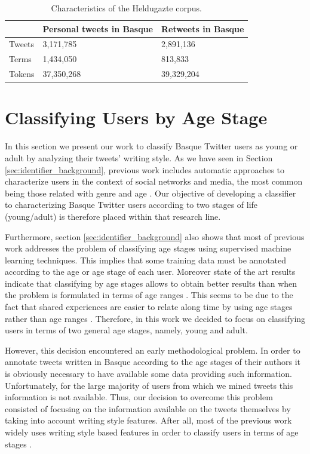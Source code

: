\documentclass[information,article,submit,moreauthors,pdftex,10pt,a4paper]{Definitions/mdpi}
\begin{document}
\begin{table}[H]
  \centering
  \begin{tabular}{lll} \hline
     & Personal tweets in Basque & Retweets in Basque \\ \hline \hline
    Tweets & 3,171,785 & 2,891,136 \\
    Terms & 1,434,050 & 813,833 \\
    Tokens & 37,350,268 & 39,329,204 \\ \hline
  \end{tabular}
  \caption{Characteristics of the Heldugazte corpus.}
  \label{tab:useful-data}
\end{table}

\section{Classifying Users by Age Stage}\label{sec:class-young-users}

In this section we present our work to classify Basque Twitter users as young or adult by analyzing their tweets' writing style. As we have seen in Section \ref{sec:identifier_background}, previous work includes automatic approaches to characterize users in the context of social networks and media, the most common being those related with genre and age \citep{cesare2017detection}. Our objective of developing a classifier to characterizing Basque Twitter users according to two stages of life (young/adult) is therefore placed within that research line.

Furthermore, section \ref{sec:identifier_background} also shows that most of previous work addresses the problem of classifying age stages using supervised machine learning techniques. This implies that some training data must be annotated according to the age or age stage of each user. Moreover state of the art  results indicate that classifying by age stages allows to obtain better results than when the problem is formulated in terms of age ranges \citep{nguyen2013old}. This seems to be due to the fact that shared experiences are easier to relate along time by using age stages rather than age ranges \citep{nguyen2016computational,eckert2017age}. Therefore, in this work we decided to focus on classifying users in terms of two general age stages, namely, young and adult.

However, this decision encountered an early methodological problem. In order to annotate tweets written in Basque according to the age stages of their authors it is obviously necessary to have available some data providing such information. Unfortunately, for the large majority of users from which we mined tweets this information is not available. Thus, our decision to overcome this problem consisted of focusing on the information available on the tweets themselves by taking into account writing style features. After all, most of the previous work widely uses writing style based features in order to classify users in terms of age stages \citep{rao2010classifying,al2012homophily,nguyen2013old,morgan2017predicting}.
\end{document}
